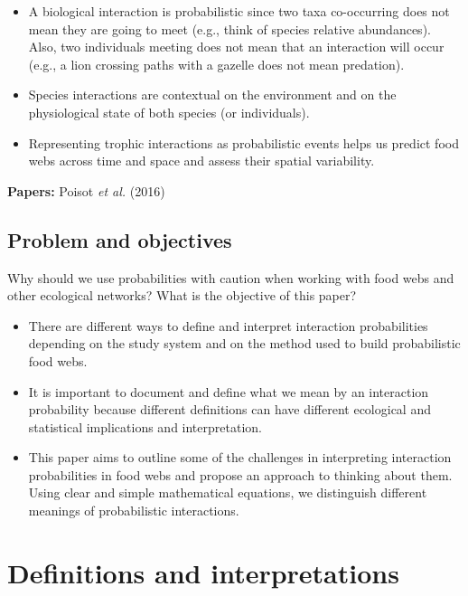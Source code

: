 \documentclass[10pt,oneside]{article}
\begin{document}
\begin{itemize}
\tightlist
\item
  A biological interaction is probabilistic since two taxa co-occurring
  does not mean they are going to meet (e.g., think of species relative
  abundances). Also, two individuals meeting does not mean that an
  interaction will occur (e.g., a lion crossing paths with a gazelle
  does not mean predation).
\item
  Species interactions are contextual on the environment and on the
  physiological state of both species (or individuals).
\item
  Representing trophic interactions as probabilistic events helps us
  predict food webs across time and space and assess their spatial
  variability.
\end{itemize}

\textbf{Papers:} Poisot \emph{et al.} (2016)

\hypertarget{problem-and-objectives}{%
\subsection{Problem and objectives}\label{problem-and-objectives}}

Why should we use probabilities with caution when working with food webs
and other ecological networks? What is the objective of this paper?

\begin{itemize}
\tightlist
\item
  There are different ways to define and interpret interaction
  probabilities depending on the study system and on the method used to
  build probabilistic food webs.
\item
  It is important to document and define what we mean by an interaction
  probability because different definitions can have different
  ecological and statistical implications and interpretation.
\item
  This paper aims to outline some of the challenges in interpreting
  interaction probabilities in food webs and propose an approach to
  thinking about them. Using clear and simple mathematical equations, we
  distinguish different meanings of probabilistic interactions.
\end{itemize}

\hypertarget{definitions-and-interpretations}{%
\section{Definitions and
interpretations}\label{definitions-and-interpretations}}
\end{document}
